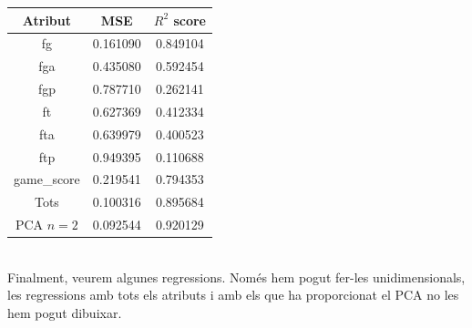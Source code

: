\documentclass{article}
\begin{document}
\begin{table}[h!]
	\begin{center}
		\begin{tabular}{|c|c|c|}\hline
			Atribut	&	MSE	&	$R^2$ score	\\ \hline
			fg & 0.161090 & 0.849104 \\ \hline
			fga & 0.435080 & 0.592454 \\ \hline
			fgp & 0.787710 & 0.262141 \\ \hline
			ft & 0.627369 & 0.412334 \\ \hline
			fta & 0.639979 & 0.400523 \\ \hline
			ftp & 0.949395 & 0.110688 \\ \hline
			game\_score & 0.219541 & 0.794353 \\ \hline
			Tots & 0.100316 & 0.895684 \\ \hline
			PCA $n=2$ & 0.092544 & 0.920129 \\ \hline
		\end{tabular}
	\end{center}
\end{table}\\
\newpage
\noindent
Finalment, veurem algunes regressions. Només hem pogut fer-les unidimensionals, les regressions amb tots els atributs i amb els que ha proporcionat el PCA no les hem pogut dibuixar.
\end{document}
